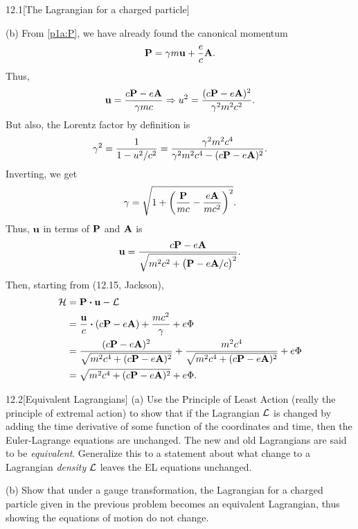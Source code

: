 \documentclass[12pt]{article}
\begin{document}
\begin{problem}{12.1}[The Lagrangian for a charged particle]
\begin{solution}
(b) From \eqref{p1a:P}, we have already found the canonical momentum
\begin{equation}
    \vb{P}=\gamma m\vb{u}+\frac{e}{c}\vb{A}. 
\end{equation}
Thus,
\begin{equation}
    \vb{u}=\frac{c\vb{P}-e\vb{A}}{\gamma mc}
    \Rightarrow u^2=\frac{(c\vb{P}-e\vb{A})^2}{\gamma^2m^2c^2}.
\end{equation}
But also, the Lorentz factor by definition is
\begin{equation}
    \gamma^2=\frac{1}{1-u^2/c^2}=\frac{\gamma^2m^2c^4}{\gamma^2m^2c^4-(c\vb{P}-e\vb{A})^2}.
\end{equation}
Inverting, we get
\begin{equation}
    \gamma=\sqrt{1+\qty(\frac{\vb{P}}{mc}-\frac{e\vb{A}}{mc^2})^2}. 
\end{equation}
Thus, $\vb{u}$ in terms of $\vb{P}$ and $\vb{A}$ is
\begin{equation}
    \vb{u}=\frac{c\vb{P}-e\vb{A}}{\sqrt{m^2c^2+\qty(\vb{P}-e\vb{A}/c)^2}}.
\end{equation}
Then, starting from (12.15, Jackson),
\begin{align}
    \HH
    &=\vb{P}\vdot\vb{u}-\LL\notag\\
    &=\frac{\vb{u}}{c}\vdot\qty(c\vb{P}-e\vb{A})+\frac{mc^2}{\gamma}+e\Phi\notag\\
    &=\frac{(c\vb{P}-e\vb{A})^2}{\sqrt{m^2c^4+(c\vb{P}-e\vb{A})^2}}
    +\frac{m^2c^4}{\sqrt{m^2c^4+(c\vb{P}-e\vb{A})^2}}+e\Phi\notag\\
    &=\sqrt{m^2c^4+(c\vb{P}-e\vb{A})^2}+e\Phi.
\end{align}

\end{solution}
\end{problem}
\newpage
\begin{problem}{12.2}[Equivalent Lagrangians]
(a) Use the Principle of Least Action (really the principle of extremal action)
to show that if the Lagrangian $\mathcal{L}$ is changed by adding the time derivative of
some function of the coordinates and time, then the Euler-Lagrange equations are
unchanged. The new and old Lagrangians are said to be \textit{equivalent}.
Generalize this to a statement about what change to a Lagrangian
\textit{density} $\mathcal{L}$ leaves the EL equations unchanged.

(b) Show that under a gauge transformation, the Lagrangian for a charged
particle given in the previous problem becomes an equivalent Lagrangian, thus
showing the equations of motion do not change.
\begin{solution}
\end{solution}
\end{problem}
\end{document}
